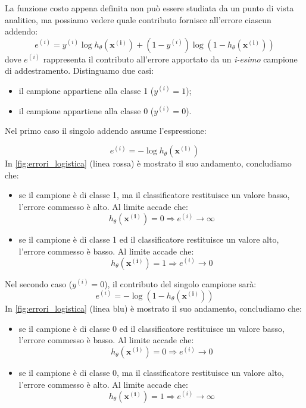 La funzione costo appena definita non può essere studiata da un punto di vista analitico, ma possiamo vedere quale contributo fornisce all'errore ciascun addendo:
 \begin{equation*}
  e^{(i)} = {y^{(i)}}\log{h_\theta(\mathbf{x^{(i)}})} + (1-y^{(i)})
 \log{(1 - h_\theta(\mathbf{x^{(i)}}))}
\end{equation*}
dove $e^{(i)}$ rappresenta il contributo all'errore apportato da un \emph{i-esimo} campione di addestramento.
 Distinguamo due casi:
\begin{itemize}
\item il campione appartiene alla classe 1  ($y^{(i)}=1$);
\item il campione appartiene alla classe 0 ($y^{(i)}=0$).
\end{itemize}
Nel primo caso il singolo addendo assume l'espressione:

 \begin{equation*}
 e^{(i)}=-\log{h_\theta(\mathbf{x^{(i)}})} 
 \end{equation*}
 In \autoref{fig:errori_logistica} (linea rossa) è mostrato il suo andamento, concludiamo che:
\begin{itemize}
\item se il campione è di classe 1, ma il classificatore restituisce un valore basso, l'errore commesso è alto. Al limite accade che:
\begin{equation*}
h_\theta(\mathbf{x^{(i)}}) = 0 \Rightarrow e^{(i)} \rightarrow \infty
\end{equation*}
\item se il campione è di classe 1 ed il classificatore restituisce un valore alto, l'errore commesso è basso. Al limite accade che:
\begin{equation*}
h_\theta(\mathbf{x^{(i)}}) = 1 \Rightarrow e^{(i)} \rightarrow 0
\end{equation*}
\end{itemize}
Nel secondo caso ($y^{(i)}=0$), il contributo del singolo campione sarà:
\begin{equation*}
 e^{(i)}=-\log{(1-h_\theta(\mathbf{x^{(i)}}))} 
 \end{equation*}
In \autoref{fig:errori_logistica} (linea blu) è mostrato il suo andamento, concludiamo che:
\begin{itemize}
\item se il campione è di classe 0 ed il classificatore restituisce un valore basso, l'errore commesso è basso. Al limite accade che:
\begin{equation*}
h_\theta(\mathbf{x^{(i)}}) = 0 \Rightarrow e^{(i)} \rightarrow 0
\end{equation*}
\item se il campione è di classe 0, ma il classificatore restituisce un valore alto, l'errore commesso è alto. Al limite accade che:
\begin{equation*}
h_\theta(\mathbf{x^{(i)}}) = 1 \Rightarrow e^{(i)} \rightarrow \infty
\end{equation*}
\end{itemize}

